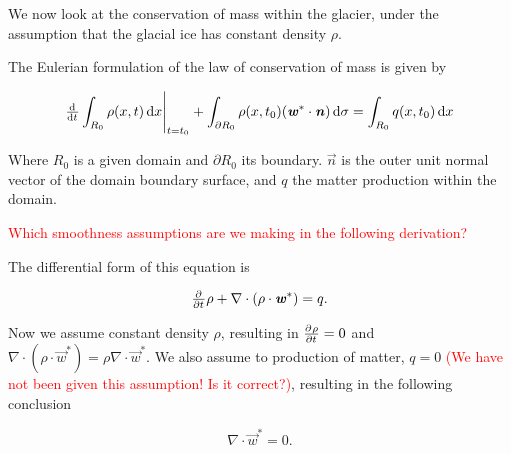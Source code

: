 We now look at the conservation of mass within the glacier, under the assumption that the glacial ice has constant density $\rho$.

The Eulerian formulation of the law of conservation of mass is given by

\begin{equation}
  \eval{\od{}{t} \int_{R_0} \rho(x, t) \dif{x}}_{t = t_0} + \int_{\partial R_0} \rho(x, t_0) (\vec{w}^* \cdot \vec{n}) \dif{\sigma} = \int_{R_0} q(x, t_0) \dif{x}
\end{equation}

Where $R_0$ is a given domain and $\partial R_0$ its boundary. $\vec{n}$ is the outer unit normal vector of the domain boundary surface, and $q$ the matter production within the domain.

\textcolor{red}{Which smoothness assumptions are we making in the following derivation?}

The differential form of this equation is

\begin{equation}
  \pd{}{t} \rho + \nabla \cdot (\rho \cdot \vec{w}^*) = q.
\end{equation}

Now we assume constant density $\rho$, resulting in $\pd{\rho}{t} = 0$ and $\nabla \cdot (\rho \cdot \vec{w}^*) = \rho \nabla \cdot \vec{w}^*$. We also assume to production of matter, $q = 0$ \textcolor{red}{(We have not been given this assumption! Is it correct?)}, resulting in the following conclusion

\begin{equation}
  \nabla \cdot \vec{w}^* = 0.
\end{equation}
